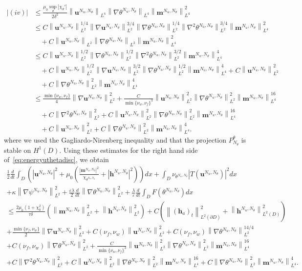 \documentclass[10pt,letterpaper,twoside]{amsart}
\theoremstyle{definition}{\newtheorem{definition}[lemma]{Definition}}
\theoremstyle{note}{\newtheorem{claim}{Claim}[section]
\newtheorem*{claim*}{Claim}}
\numberwithin{equation}{section}
\newcommand{\dom}{D}
\newcommand{\norm}[1]{\left\| #1 \right\|}
\newcommand{\Grad}{\nabla}
\newcommand{\bmb}{\mathbf{m}^{N_u,N_\theta}}
\newcommand{\bhb}{\mathbf{h}^{N_u,N_\theta}}
\newcommand{\bub}{\mathbf{u}^{N_u,N_\theta}}
\newcommand{\thb}{\theta^{N_u,N_\theta}}
\newcommand{\psib}{\psi^{N_u,N_\theta}}
\newcommand{\bh}{\mathbf{h}}
\begin{document}
 \begin{align*}
	|(iv)|&\leq \frac{\mu_0\sup_{\theta}|\chi_\theta'|}{2\delta^2}\norm{\bub}_{L^4}\norm{\Grad\thb}_{L^4}\norm{\bmb}_{L^4}^2\\
	& \leq  C \norm{\bub}_{L^2}^{1/4}\norm{\Grad\bub}_{L^2}^{3/4} \norm{\Grad \thb}_{L^2}^{1/4}\norm{\Grad^2\thb}_{L^2}^{3/4}\norm{\bmb}_{L^4}^2\\
	&\quad + C \norm{\bub}_{L^2}\norm{\Grad\thb}_{L^2}\norm{\bmb}_{L^4}^2\\
	& \leq C \norm{\bub}_{L^2}^{1/2}\norm{\Grad \thb}_{L^2}^{1/2}\norm{\Grad^2\thb}_{L^2}^{3/2}\norm{\bmb}_{L^4}^4\\
	&\quad  + C \norm{\bub}_{L^2}^{1/2}\norm{\Grad\bub}_{L^2}^{3/2} \norm{\Grad \thb}_{L^2}^{1/2}\norm{\bmb}_{L^4}^4+ C \norm{\bub}_{L^2}^2\\
	&\quad + C \norm{\Grad\thb}_{L^2}^2\norm{\bmb}_{L^4}^4\\
	& \leq \frac{\min\{\nu_w,\nu_f\}}{4}\norm{\Grad\bub}_{L^2}^2 + \frac{C}{\min\{\nu_w,\nu_f\}^3} \norm{\bub}_{L^2}^2\norm{\Grad\thb}_{L^2}^2\norm{\bmb}_{L^4}^{16} \\
	&\quad + C \norm{\Grad^2\thb}_{L^2}^2 + C \norm{\bub}_{L^2}^2\norm{\Grad\thb}_{L^2}^2\norm{\bmb}_{L^4}^{16}\\
	&\quad + C \norm{\bub}_{L^2}^2+ C \norm{\Grad\thb}_{L^2}^2\norm{\bmb}_{L^4}^4.
\end{align*}
where we used the Gagliardo-Nirenberg inequality and that the  projection $P_{N_\theta}^\theta$ is stable on $H^1(\dom)$.
Using these estimates for the right hand side of~\eqref{eq:energyuthetadisc}, we obtain
 \begin{multline}\label{eq:energyuthetadisc2}
	\frac{1}{2}\frac{d}{dt}\int_{\dom} \left(|\bub|^2 + \mu_0\left(\frac{|\bmb|^2}{\chi_{\thb}}+|\bhb |^2\right) \right)dx+ \int_{\dom}\nu_{\thb} |T(\bub)|^2 dx \\
	 +\kappa\norm{\Grad\psib}_{L^2}^2+\frac{\varepsilon\lambda}{2}\frac{d}{dt}\norm{\Grad\thb}_{L^2}^2 +\frac{\lambda}{\varepsilon}\frac{d}{dt}\int_{\dom} F(\thb) dx\\
	\leq \frac{2\mu_0(1+\chi_0^2)}{\tau\delta}\left(\norm{\bmb}_{L^2}^2 + \norm{\bhb}_{L^2}^2\right)+C (\norm{(\bh_a)_t}_{L^2(\partial\dom)}^2 + \norm{\bhb}_{L^2(\dom)}^2) \\
	+\frac{\min\{\nu_f,\nu_w\}}{2}\norm{\Grad\bub}_{L^2}^2 + C(\nu_f,\nu_w)\norm{\bub}_{L^2}^{2}+ C(\nu_f,\nu_w)\norm{\Grad\thb}_{L^2}^{14/4}  \\
	+ C(\nu_f,\nu_w)\norm{\Grad\thb}_{L^2}^{2}
	+ \frac{C}{\min\{\nu_w,\nu_f\}^3} \norm{\bub}_{L^2}^2\norm{\Grad\thb}_{L^2}^2\norm{\bmb}_{L^4}^{16} \\
	+ C \norm{\Grad^2\thb}_{L^2}^2 + C \norm{\bub}_{L^2}^2\norm{\Grad\thb}_{L^2}^2\norm{\bmb}_{L^4}^{16}
	+ C \norm{\Grad\thb}_{L^2}^2\norm{\bmb}_{L^4}^4.
\end{multline}
\end{document}
